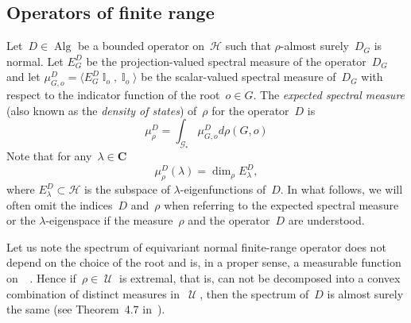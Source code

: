 \documentclass[english]{article}
\theoremstyle{definition}
\DeclareMathOperator{\Alg}{Alg} %
\DeclareMathOperator{\I}{{\mathbb{I}}}
\DeclareMathOperator{\U}{{\mathcal{U}}}
\DeclareMathOperator{\Gr}{{\mathcal{G}_*}}
\newcommand*{\field}[1]{\mathbf{#1}} %
\newcommand*\C{\field{C}} %
\begin{document}
\subsection{Operators of finite range}
Let~$D \in \Alg$ be a bounded operator on~$\mathcal{H}$ such that $\rho$-almost surely~$D_G$ is normal.  Let $E_{G}^D$ be the projection-valued spectral measure of the operator~$D_G$ and let $\mu_{G, o}^D = \langle E_{G}^D \I_o, \I_o \rangle$ be the scalar-valued spectral measure of~$D_G$ with respect to the indicator function of the root~$o \in G$. 
The \emph{expected spectral measure} (also known as the \emph{density of states}) of~$\rho$ for the operator~$D$ is 
$$
\mu_\rho^D = \int_{\mathcal{G_*}} \mu_{G,o}^D d \rho(G,o)
$$
Note that for any~$\lambda \in \C$ 
\begin{equation}\label{eq_dimatom}
    \mu_\rho^D(\lambda) = \dim_\rho E_\lambda^D, 
\end{equation}
where $E_\lambda^D \subset \mathcal{H}$ is the subspace of $\lambda$-eigenfunctions of~$D$. In what follows, we will often omit the indices~$D$ and~$\rho$ when referring to the expected spectral measure or the $\lambda$-eigenspace if the measure~$\rho$ and the operator~$D$ are understood. 

 Let us note the spectrum of equivariant normal finite-range operator does not depend on the choice of the root and is, in a proper sense, a measurable function on~$\Gr$. Hence if~$\rho \in \U$ is extremal, that is, can not be decomposed into a convex combination of distinct measures in~$\U$, then the spectrum of~$D$ is almost surely the same (see Theorem~4.7 in~\cite{AL07}). %
\end{document}
